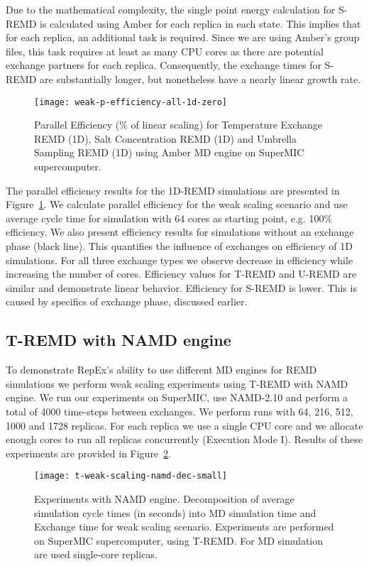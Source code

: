 \documentclass{sig-alternate-05-2015}
\begin{document}
Due to the mathematical complexity, the single point energy calculation for S-REMD is calculated using Amber for each replica in each state.  This implies that for each replica, an additional task is required. Since we are using Amber's group files, this task requires at least as many CPU cores as there are potential exchange partners for each replica. Consequently, the exchange times for S-REMD are substantially longer, but nonetheless have a nearly linear growth rate.

\begin{figure}[ht!]
  \centering
  \texttt{[image: weak-p-efficiency-all-1d-zero]}
  \caption{\small{Parallel Efficiency (\% of linear scaling) for Temperature Exchange REMD (1D), Salt Concentration REMD (1D) and Umbrella Sampling REMD (1D) using Amber MD engine on SuperMIC supercomputer.}
  }
  \label{fig:p_efficiency_1d}
\end{figure}

The parallel efficiency results for the 1D-REMD simulations are presented 
in Figure~\ref{fig:p_efficiency_1d}. We calculate parallel efficiency for the weak 
scaling scenario and use average cycle time for simulation with 64 cores as 
starting point, e.g. 100\% efficiency. We also present efficiency results for 
simulations without an exchange phase (black line). This quantifies the influence 
of exchanges on efficiency of 1D simulations. For all three exchange types we observe 
decrease in efficiency while increasing the number of cores. Efficiency values 
for T-REMD and U-REMD are similar and demonstrate linear behavior. Efficiency for S-REMD 
is lower. This is caused by specifics of exchange phase, discussed earlier.

\subsection{T-REMD with NAMD engine} \label{exp.namd.t-remd}

To demonstrate RepEx's ability to use different MD engines for REMD simulations we perform weak scaling experiments using T-REMD with NAMD engine. We run our experiments on SuperMIC, use NAMD-2.10 and perform a total of 4000 time-steps between exchanges. We perform runs with 64, 216, 512, 1000 and 1728 replicas. For each replica we use a single CPU core and we allocate enough cores to run all replicas concurrently (Execution Mode I). Results of these experiments are provided in Figure~\ref{fig:t-remd-namd}.

\begin{figure}[ht!]
\centering
\texttt{[image: t-weak-scaling-namd-dec-small]}
\caption{\small{Experiments with NAMD engine. Decomposition of average simulation cycle times  (in seconds) into MD simulation time and Exchange time for weak scaling scenario. Experiments are performed on SuperMIC supercomputer, using T-REMD. For MD simulation are used single-core replicas.}}
\label{fig:t-remd-namd}
\end{figure}
\end{document}

